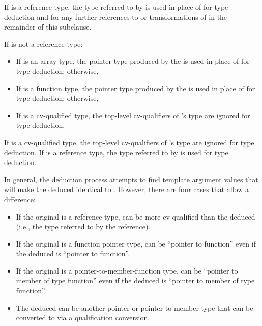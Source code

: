 \pnum
If  is a reference type, the type referred to by  is used in place
of  for type deduction and for any further references to or transformations of
 in the remainder of this subclause.

\pnum
If
is not a reference type:

\begin{itemize}
\item
If
is an array type, the pointer type produced by the
 is used in place of
for type
deduction; otherwise,
\item
If
is a function type, the pointer type produced by the
 is used in place of
for
type deduction; otherwise,
\item
If
is a cv-qualified type, the top-level cv-qualifiers of
's
type are ignored for type deduction.
\end{itemize}

\pnum
If
is a cv-qualified type, the top-level cv-qualifiers of
's
type are ignored for type deduction.
If
is a
reference type, the type referred to by
is used for type deduction.

\pnum
In general, the deduction process attempts to find template argument
values that will make the deduced
identical to
.
However, there are four cases that allow a difference:

\begin{itemize}
\item
If the original  is a reference type,
 can be more cv-qualified than the deduced 
(i.e., the type referred to by the reference).
\item
If the original  is a function pointer type,
 can be ``pointer to function''
even if the deduced  is ``pointer to  function''.
\item
If the original  is a pointer-to-member-function type,
 can be ``pointer to member of type function''
even if the deduced  is ``pointer to member of type  function''.
\item
The deduced 
can be another pointer or pointer-to-member type that
can be converted to  via a qualification conversion.
\end{itemize}

